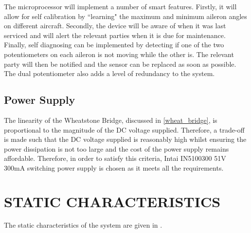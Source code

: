\documentclass[10pt,twocolumn]{witseiepaper}
\begin{document}
The microprocessor will implement a number of smart features. Firstly, it will allow for self calibration by ``learning" the maximum and minimum aileron angles on different aircraft. Secondly, the device will be aware of when it was last serviced and will alert the relevant parties when it is due for maintenance. Finally, self diagnosing can be implemented by detecting if one of the two potentiometers on each aileron is not moving while the other is. The relevant party will then be notified and the sensor can be replaced as soon as possible. The dual potentiometer also adds a level of redundancy to the system.  


\subsection{Power Supply} 

The linearity of the Wheatstone Bridge, discussed in \cref{wheat_bridge}, is proportional to the magnitude of the DC voltage supplied. Therefore, a trade-off is made such that the DC voltage supplied is reasonably high whilst ensuring the power dissipation is not too large and the cost of the power supply remains affordable. Therefore, in order to satisfy this criteria, Intai IN5100300 51V 300mA switching power supply \cite{psu} is chosen as it meets all the requirements.

\section{STATIC CHARACTERISTICS}

The static characteristics of the system are given in .
\end{document}
